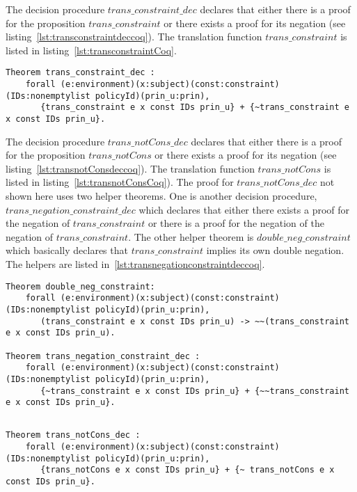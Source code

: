 The decision procedure $trans\_constraint\_dec$ declares that either there is a proof for the proposition $trans\_constraint$ or there exists a proof for its negation (see listing~\ref{lst:transconstraintdeccoq}). The translation function $trans\_constraint$ is listed in listing~\ref{lst:transconstraintCoq}. 


\begin{lstlisting}
Theorem trans_constraint_dec :
    forall (e:environment)(x:subject)(const:constraint)(IDs:nonemptylist policyId)(prin_u:prin),
       {trans_constraint e x const IDs prin_u} + {~trans_constraint e x const IDs prin_u}.
\end{lstlisting}


The decision procedure $trans\_notCons\_dec$ declares that either there is a proof for the proposition $trans\_notCons$ or there exists a proof for its negation (see listing~\ref{lst:transnotConsdeccoq}). The translation function $trans\_notCons$ is listed in listing~\ref{lst:transnotConsCoq}). The proof for $trans\_notCons\_dec$ not shown here uses two helper theorems. One is another decision procedure, \\ $trans\_negation\_constraint\_dec$ which declares that either there exists a proof for the negation of $trans\_constraint$ or there is a proof for the negation of the negation of $trans\_constraint$. The other helper theorem is $double\_neg\_constraint$ which basically declares that $trans\_constraint$ implies its own double negation. The helpers are listed in~\ref{lst:transnegationconstraintdeccoq}.

\begin{lstlisting}
Theorem double_neg_constraint:
    forall (e:environment)(x:subject)(const:constraint)(IDs:nonemptylist policyId)(prin_u:prin),
       (trans_constraint e x const IDs prin_u) -> ~~(trans_constraint e x const IDs prin_u).
  
Theorem trans_negation_constraint_dec :
    forall (e:environment)(x:subject)(const:constraint)(IDs:nonemptylist policyId)(prin_u:prin),
       {~trans_constraint e x const IDs prin_u} + {~~trans_constraint e x const IDs prin_u}.
       
\end{lstlisting}

\begin{lstlisting}
Theorem trans_notCons_dec :
    forall (e:environment)(x:subject)(const:constraint)(IDs:nonemptylist policyId)(prin_u:prin),
       {trans_notCons e x const IDs prin_u} + {~ trans_notCons e x const IDs prin_u}.

\end{lstlisting}


